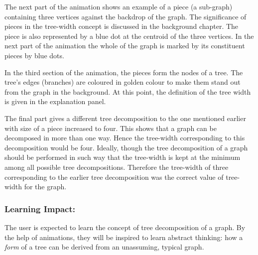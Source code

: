 The next part of the animation shows an example of a piece (a sub-graph)
containing three vertices against the backdrop of the graph. The significance
of pieces in the tree-width concept is discussed in the background chapter.
The piece is also represented by a blue dot at the centroid of the three
vertices. In the next part of the animation the whole of the graph is marked by
its constituent pieces by blue dots. 

In the third section of the animation, the pieces form the nodes of a tree. The tree's edges
(branches) are coloured in golden colour to make them stand out from the graph in
the background. At this point, the definition of the tree width is given in
the explanation panel.

The final part gives a different tree decomposition to the one mentioned
earlier with size of a piece increased to four. This shows that a graph can be
decomposed in more than one way. Hence the tree-width corresponding to this
decomposition would be four. Ideally, though the tree decomposition of a graph
should be performed in such way that the tree-width is kept at the minimum
among all possible tree decompositions. Therefore the tree-width of three
corresponding to the earlier tree decomposition was the correct value of
tree-width for the graph.

\subsubsection{Learning Impact:}
The user is expected to learn the concept of tree decomposition of a graph.
By the help of animations, they will be inspired to learn abstract
thinking: how a \emph{form} of a tree can be derived from an unassuming,
typical graph.
